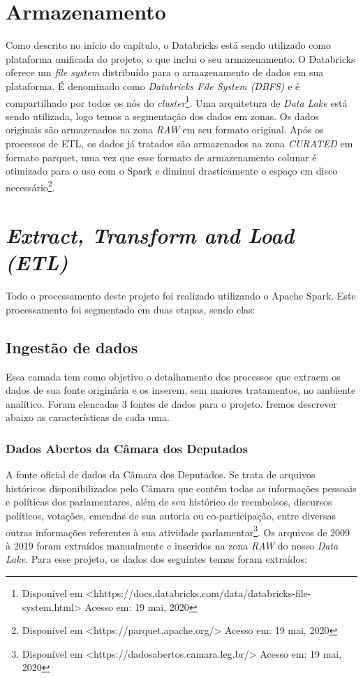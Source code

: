 \section{Armazenamento} Como descrito no início do capítulo, o Databricks está sendo utilizado como plataforma unificada do projeto, o que inclui o seu armazenamento. O Databricks oferece um \textit{file system} distribuído para o armazenamento de dados em sua plataforma. É denominado como \textit{Databricks File System (DBFS)} e é compartilhado por todos os nós do \textit{cluster}\footnote{Disponível em <hhttps://docs.databricks.com/data/databricks-file-system.html> Acesso em: 19 mai, 2020}. Uma arquitetura de \textit{Data Lake} está sendo utilizada, logo temos a segmentação dos dados em zonas. Os dados originais são armazenados na zona \textit{RAW} em seu formato original. Após os processos de ETL, os dados já tratados são armazenados na zona \textit{CURATED} em formato parquet, uma vez que esse formato de armazenamento colunar é otimizado para o uso com o Spark e diminui drasticamente o espaço em disco necessário\footnote{Disponível em <https://parquet.apache.org/> Acesso em: 19 mai, 2020}.

\section{\textit{Extract, Transform and Load (ETL)}} Todo o processamento deste projeto foi realizado utilizando o Apache Spark. Este processamento foi segmentado em duas etapas, sendo elas:

\subsection{Ingestão de dados} Essa camada tem como objetivo o detalhamento dos processos que extraem os dados de sua fonte originária e os inserem, sem maiores tratamentos, no ambiente analítico. Foram elencadas 3 fontes de dados para o projeto. Iremos descrever abaixo as características de cada uma.

\subsubsection{Dados Abertos da Câmara dos Deputados} A fonte oficial de dados da Câmara dos Deputados. Se trata de arquivos históricos disponibilizados pelo Câmara que contém todas as informações pessoais e políticas dos parlamentares, além de seu histórico de reembolsos, discursos políticos, votações, emendas de sua autoria ou co-participação, entre diversas outras informações referentes à sua atividade parlamentar\footnote{Disponível em <https://dadosabertos.camara.leg.br/> Acesso em: 19 mai, 2020}. Os arquivos de 2009 à 2019 foram extraídos manualmente e inseridos na zona \textit{RAW} do nosso \textit{Data Lake}. Para esse projeto, os dados dos seguintes temas foram extraídos:

